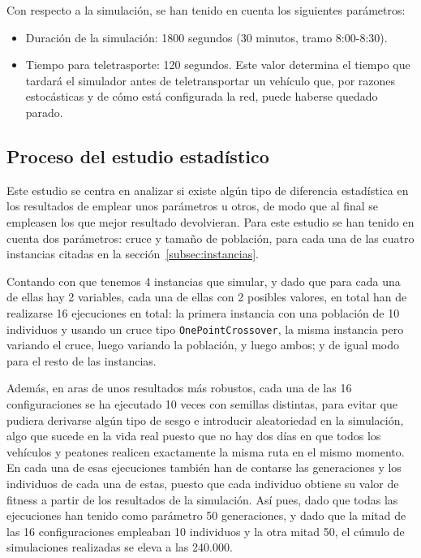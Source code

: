 Con respecto a la simulación, se han tenido en cuenta los siguientes parámetros:

\begin{itemize}
    \item Duración de la simulación: 1800 segundos (30 minutos, tramo 8:00-8:30).
    \item Tiempo para teletrasporte: 120 segundos. Este valor determina el tiempo que tardará el simulador antes de teletransportar un vehículo que, por razones estocásticas y de cómo está configurada la red, puede haberse quedado parado.
\end{itemize}


\subsection{Proceso del estudio estadístico}

Este estudio se centra en analizar si existe algún tipo de diferencia estadística en los resultados de emplear unos parámetros u otros, de modo que al final se empleasen los que mejor resultado devolvieran. Para este estudio se han tenido en cuenta dos parámetros: cruce y tamaño de población, para cada una de las  cuatro instancias citadas en la sección~\ref{subsec:instancias}.

Contando con que tenemos 4 instancias que simular, y dado que para cada una de ellas hay 2 variables, cada una de ellas con 2 posibles valores, en total han de realizarse 16 ejecuciones en total: la primera instancia con una población de 10 individuos y usando un cruce tipo \texttt{OnePointCrossover}, la misma instancia pero variando el cruce, luego variando la población, y luego ambos; y de igual modo para el resto de las instancias.

Además, en aras de unos resultados más robustos, cada una de las 16 configuraciones se ha ejecutado 10 veces con semillas distintas, para evitar que pudiera derivarse algún tipo de sesgo e introducir aleatoriedad en la simulación, algo que sucede en la vida real puesto que no hay dos días en que todos los vehículos y peatones realicen exactamente la misma ruta en el mismo momento. En cada una de esas ejecuciones también han de contarse las generaciones y los individuos de cada una de estas, puesto que cada individuo obtiene su valor de fitness a partir de los resultados de la simulación. Así pues, dado que todas las ejecuciones han tenido como parámetro 50 generaciones, y dado que la mitad de las 16 configuraciones empleaban 10 individuos y la otra mitad 50, el cúmulo de simulaciones realizadas se eleva a las 240.000.

